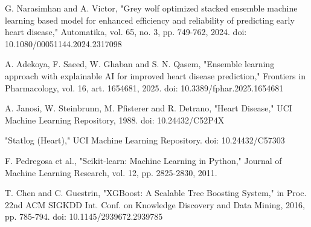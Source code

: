\documentclass[12pt,a4paper,oneside]{report}
\begin{document}
\begin{enumerate}[label={[\arabic*]},leftmargin=2.2em]
  \item G. Narasimhan and A. Victor, "Grey wolf optimized stacked ensemble machine learning based model for enhanced efficiency and reliability of predicting early heart disease," Automatika, vol. 65, no. 3, pp. 749-762, 2024. doi: 10.1080/00051144.2024.2317098
  \item A. Adekoya, F. Saeed, W. Ghaban and S. N. Qasem, "Ensemble learning approach with explainable AI for improved heart disease prediction," Frontiers in Pharmacology, vol. 16, art. 1654681, 2025. doi: 10.3389/fphar.2025.1654681
  \item A. Janosi, W. Steinbrunn, M. Pfisterer and R. Detrano, "Heart Disease," UCI Machine Learning Repository, 1988. doi: 10.24432/C52P4X
  \item "Statlog (Heart)," UCI Machine Learning Repository. doi: 10.24432/C57303
  \item F. Pedregosa et al., "Scikit-learn: Machine Learning in Python," Journal of Machine Learning Research, vol. 12, pp. 2825-2830, 2011.
  \item T. Chen and C. Guestrin, "XGBoost: A Scalable Tree Boosting System," in Proc. 22nd ACM SIGKDD Int. Conf. on Knowledge Discovery and Data Mining, 2016, pp. 785-794. doi: 10.1145/2939672.2939785
\end{enumerate}
\end{document}
